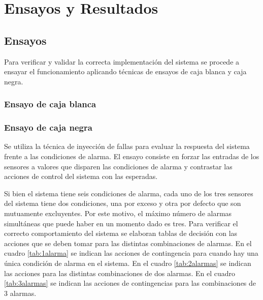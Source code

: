 
\chapter{Ensayos y Resultados} %

\label{Chapter4} %


\section{Ensayos}

Para verificar y validar la correcta implementación del sistema se procede a ensayar el funcionamiento aplicando técnicas de ensayos de caja blanca y caja negra.
\subsection{Ensayo de caja blanca}




\subsection{Ensayo de caja negra}

Se utiliza la técnica de inyección de fallas para evaluar la respuesta del sistema frente a las condiciones de alarma.  El ensayo consiste en forzar las entradas de los sensores a valores que disparen las condiciones de alarma y contrastar las acciones de control del sistema con las esperadas.

Si bien el sistema tiene seis condiciones de alarma, cada uno de los tres sensores del sistema tiene dos condiciones, una por exceso y otra por defecto que son mutuamente excluyentes.  Por este motivo, el máximo número de alarmas simultáneas que puede haber en un momento dado es tres.  Para verificar el correcto comportamiento del sistema se elaboran tablas de decisión con las acciones que se deben tomar para las distintas combinaciones de alarmas. En el cuadro \ref{tab:1alarma} se indican las acciones de contingencia para cuando hay una única condición de alarma en el sistema.  En el cuadro \ref{tab:2alarmas} se indican las acciones para las distintas combinaciones de dos alarmas. En el cuadro \ref{tab:3alarmas} se indican las acciones de contingencias para las combinaciones de 3 alarmas.


